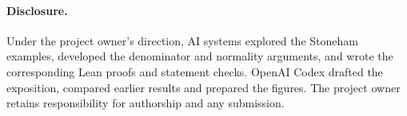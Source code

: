 \documentclass[11pt]{article}
\begin{document}
\paragraph{Disclosure.} Under the project owner's direction, AI systems explored the Stoneham examples, developed the denominator and normality arguments, and wrote the corresponding Lean proofs and statement checks. OpenAI Codex drafted the exposition, compared earlier results and prepared the figures. The project owner retains responsibility for authorship and any submission.

\begingroup
\small


\endgroup
\end{document}

